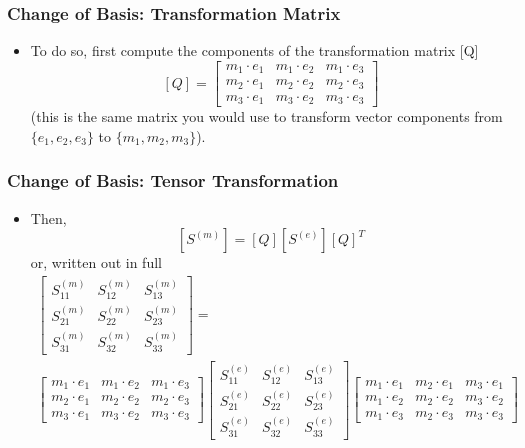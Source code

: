 \documentclass[aspectratio=169,11pt]{beamer}
\begin{document}
\begin{frame}
\frametitle{Change of Basis: Transformation Matrix}
\begin{itemize}
    \item To do so, first compute the components of the transformation matrix [Q]
    \[
    [Q] =
    \begin{bmatrix}
        m_1 \cdot e_1 & m_1 \cdot e_2 & m_1 \cdot e_3 \\
        m_2 \cdot e_1 & m_2 \cdot e_2 & m_2 \cdot e_3 \\
        m_3 \cdot e_1 & m_3 \cdot e_2 & m_3 \cdot e_3
    \end{bmatrix}
    \]
    (this is the same matrix you would use to transform vector components from \(\{e_1, e_2, e_3\}\) to \(\{m_1, m_2, m_3\}\)).
\end{itemize}
\end{frame}

\begin{frame}
\frametitle{Change of Basis: Tensor Transformation}
\begin{itemize}
    \item Then,
    \[
    [S^{(m)}] = [Q] [S^{(e)}] [Q]^T
    \]
    or, written out in full
    \scriptsize
    \begin{multline*}
    \begin{bmatrix}
        S_{11}^{(m)} & S_{12}^{(m)} & S_{13}^{(m)} \\
        S_{21}^{(m)} & S_{22}^{(m)} & S_{23}^{(m)} \\
        S_{31}^{(m)} & S_{32}^{(m)} & S_{33}^{(m)}
    \end{bmatrix} =
    \\
    \begin{bmatrix}
        m_1 \cdot e_1 & m_1 \cdot e_2 & m_1 \cdot e_3 \\
        m_2 \cdot e_1 & m_2 \cdot e_2 & m_2 \cdot e_3 \\
        m_3 \cdot e_1 & m_3 \cdot e_2 & m_3 \cdot e_3
    \end{bmatrix}
    \begin{bmatrix}
        S_{11}^{(e)} & S_{12}^{(e)} & S_{13}^{(e)} \\
        S_{21}^{(e)} & S_{22}^{(e)} & S_{23}^{(e)} \\
        S_{31}^{(e)} & S_{32}^{(e)} & S_{33}^{(e)}
    \end{bmatrix}
    \begin{bmatrix}
        m_1 \cdot e_1 & m_2 \cdot e_1 & m_3 \cdot e_1 \\
        m_1 \cdot e_2 & m_2 \cdot e_2 & m_3 \cdot e_2 \\
        m_1 \cdot e_3 & m_2 \cdot e_3 & m_3 \cdot e_3
    \end{bmatrix}
    \end{multline*}
\end{itemize}
\end{frame}
\end{document}
